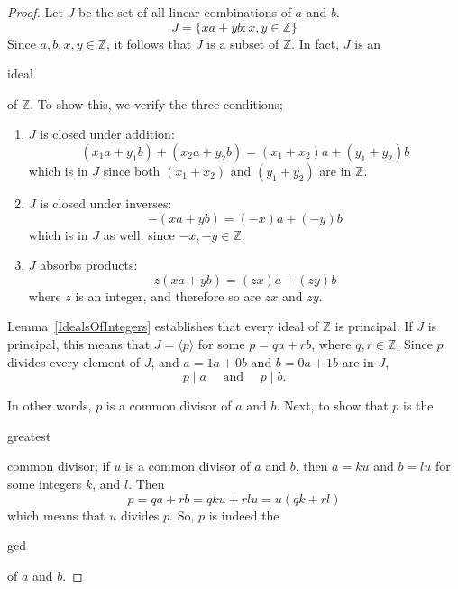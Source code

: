 \documentclass{article}
\theoremstyle{definition}
\theoremstyle{definition}
\begin{document}
\begin{proof} 
  Let $J$ be the set of all linear combinations of $a$ and $b$. 
  $$J = \{ xa + yb : x, y \in \mathbb{Z} \}$$ 
  Since $a, b, x, y \in \mathbb{Z}$, it follows that $J$ is a subset of $\mathbb{Z}$. In fact, $J$ is an \begin{em}ideal\end{em} of $\mathbb{Z}$. To show this, we verify the three conditions;

  \begin{enumerate}
    \item $J$ is closed under addition: 
      $$(x_1a + y_1b) + (x_2a + y_2b) = (x_1 + x_2)a + (y_1 + y_2)b$$
      which is in $J$ since both $(x_1 + x_2)$ and $(y_1 + y_2)$ are in $\mathbb{Z}$.
    \item $J$ is closed under inverses: 
      $$-(xa + yb) = (-x)a + (-y)b$$ 
      which is in $J$ as well, since $-x, -y \in \mathbb{Z}$.
    \item $J$ absorbs products: 
      $$z(xa + yb) = (zx)a + (zy)b$$ 
      where $z$ is an integer, and therefore so are $zx$ and $zy$.
  \end{enumerate}

  Lemma~\ref{IdealsOfIntegers} establishes that every ideal of $\mathbb{Z}$ is principal. If $J$ is principal, this means that $ J = \langle p \rangle $ for some $p = qa + rb$, where $q, r \in \mathbb{Z}$. Since $p$ divides every element of $J$, and $a = 1a + 0b$ and $b = 0a + 1b$ are in $J$, 
  $$p \mid a \quad \text{ and } \quad p \mid b.$$

  In other words, $p$ is a common divisor of $a$ and $b$. Next, to show that $p$ is the \begin{em}greatest\end{em} common divisor; if $u$ is a common divisor of $a$ and $b$, then $a = ku$ and $b = lu$ for some integers $k$, and $l$. Then
  $$p = qa + rb = qku + rlu = u(qk + rl)$$
  which means that $u$ divides $p$. So, $p$ is indeed the \begin{em}gcd\end{em} of $a$ and $b$.
\end{proof}
\end{document}
